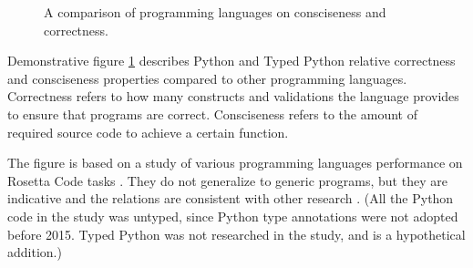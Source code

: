 \begin{figure}[h!]
    \centering
    \caption{A comparison of programming languages on consciseness and correctness.}
    \label{fig:language_comparison}
\end{figure}


Demonstrative figure \ref{fig:language_comparison} describes Python and Typed Python relative correctness and consciseness properties compared to other programming languages. Correctness refers to how many constructs and validations the language provides to ensure that programs are correct. Consciseness refers to the amount of required source code to achieve a certain function.

The figure is based on a study of various programming languages performance on Rosetta Code tasks \cite{nanz_comparative_2015}. They do not generalize to generic programs, but they are indicative and the relations are consistent with other research \cite{ray_codequality_2014}. (All the Python code in the study was untyped, since Python type annotations were not adopted before 2015. Typed Python was not researched in the study, and is a hypothetical addition.)

